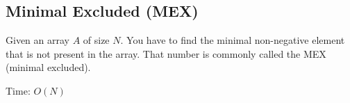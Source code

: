 \subsection{Minimal Excluded (MEX)}

Given an array $A$ of size $N$. You have to find the minimal non-negative
element that is not present in the array. That number is commonly called the
MEX (minimal excluded).

Time: $O(N)$
